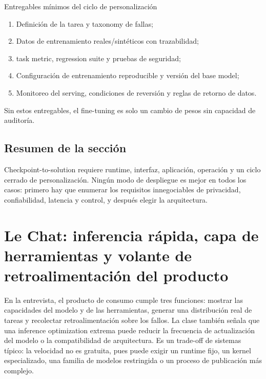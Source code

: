 \documentclass[a4paper]{article}
\begin{document}
\begin{importantbox}{Entregables mínimos del ciclo de personalización}
\begin{enumerate}
  \item Definición de la tarea y taxonomy de fallas;
  \item Datos de entrenamiento reales/sintéticos con trazabilidad;
  \item task metric, regression suite y pruebas de seguridad;
  \item Configuración de entrenamiento reproducible y versión del base model;
  \item Monitoreo del serving, condiciones de reversión y reglas de retorno de datos.
\end{enumerate}
Sin estos entregables, el fine-tuning es solo un cambio de pesos sin capacidad de auditoría.
\end{importantbox}


\subsection{Resumen de la sección}

Checkpoint-to-solution requiere runtime, interfaz, aplicación, operación y un ciclo cerrado de personalización. Ningún modo de despliegue es mejor en todos los casos: primero hay que enumerar los requisitos innegociables de privacidad, confiabilidad, latencia y control, y después elegir la arquitectura.
\section{Le Chat: inferencia rápida, capa de herramientas y volante de retroalimentación del producto}

En la entrevista, el producto de consumo cumple tres funciones: mostrar las capacidades del modelo y de las herramientas, generar una distribución real de tareas y recolectar retroalimentación sobre los fallos. La clase también señala que una inference optimization extrema puede reducir la frecuencia de actualización del modelo o la compatibilidad de arquitectura. Es un trade-off de sistemas típico: la velocidad no es gratuita, pues puede exigir un runtime fijo, un kernel especializado, una familia de modelos restringida o un proceso de publicación más complejo.
\end{document}
